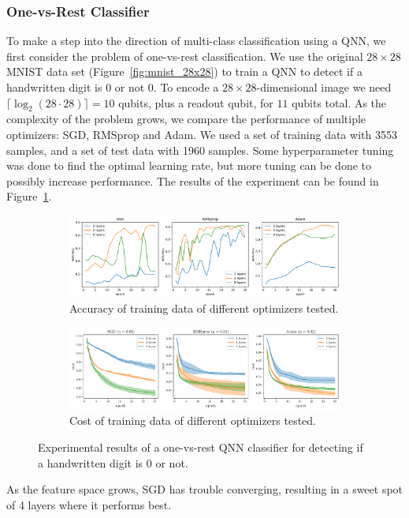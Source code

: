 \documentclass[a4paper,10pt]{article}
\begin{document}
\subsubsection{One-vs-Rest Classifier}
To make a step into the direction of multi-class classification using a QNN, we first consider the problem of one-vs-rest classification.
We use the original $28 \times 28$ MNIST data set (Figure~\ref{fig:mnist_28x28}) to train a QNN to detect if a handwritten digit is 0 or not 0.
To encode a $28 \times 28$-dimensional image we need $\lceil \log_2(28 \cdot 28) \rceil = 10$ qubits, plus a readout qubit, for $11$ qubits total.
As the complexity of the problem grows, we compare the performance of multiple optimizers: SGD, RMSprop and Adam.
We used a set of training data with 3553 samples, and a set of test data with 1960 samples.
Some hyperparameter tuning was done to find the optimal learning rate, but more tuning can be done to possibly increase performance.
The results of the experiment can be found in Figure~\ref{fig:ovr_results}.
\begin{figure}[ht]
	\centering
	\begin{subfigure}{1\textwidth}
		\centering
		\includegraphics[width=1\linewidth]{figures/qnn_ovr_accuracy.png}
		\caption{Accuracy of training data of different optimizers tested.}
		\vspace*{4mm}
	\end{subfigure}
	\begin{subfigure}{1\textwidth}
		\centering
		\includegraphics[width=1\linewidth]{figures/qnn_ovr_cost}
		\caption{Cost of training data of different optimizers tested.}
	\end{subfigure}
	\caption{Experimental results of a one-vs-rest QNN classifier for detecting if a handwritten digit is 0 or not.}
	\label{fig:ovr_results}
\end{figure}
As the feature space grows, SGD has trouble converging, resulting in a sweet spot of 4 layers where it performs best.
\end{document}

